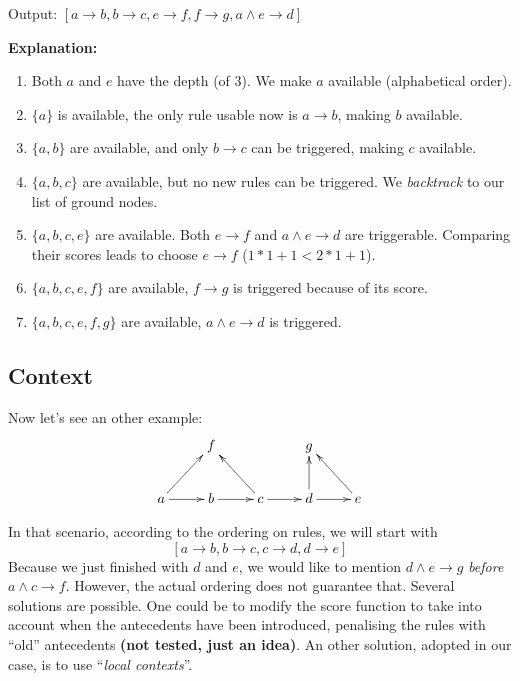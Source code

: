 \documentclass[a4paper]{article}
\newcommand*{\say}[1]{``{#1}''}
\newcommand*{\rar}{\rightarrow}                         %
\newcommand*{\conj}{\wedge}                             %
\begin{document}
\begin{center}
  \begin{minipage}{0.74\textwidth}
    Output: $ [a\rar b, b\rar c, e\rar f, f\rar g, a\conj e\rar d] $
  \end{minipage}
\end{center}

\textbf{Explanation:}
\begin{enumerate}
  \item Both $a$ and $e$ have the depth (of 3). We make $a$ available (alphabetical order).
  \item $\{a\}$ is available, the only rule usable now is $a \rar b$, making $b$ available.
  \item $\{a, b\}$ are available, and only $b\rar c$ can be triggered, making $c$ available.
  \item $\{a, b, c\}$ are available, but no new rules can be triggered. We \emph{backtrack} to our list of ground nodes.
  \item $\{a, b, c, e\}$ are available. Both $e \rar f$ and $a \conj e\rar d$ are triggerable.
        Comparing their scores leads to choose $e\rar f$ ($1*1+1 < 2*1+1$).
  \item $\{a, b, c, e, f\}$ are available, $f \rar g$ is triggered because of its score.
  \item $\{a, b, c, e, f, g\}$ are available, $a \conj e\rar d$ is triggered.
\end{enumerate}



\subsection{Context}\label{sec:ctx}

Now let's see an other example:
\[
  \xymatrix{%
                    & f       &                 & g             &           \\
    a\ar[r]\ar[ur]  & b\ar[r] & c\ar[r]\ar[ul]  & d\ar[r]\ar[u] & e\ar[ul]
  }
\]

In that scenario, according to the ordering on rules, we will start with
\[ [ a\rar b, b \rar c, c \rar d, d \rar e ] \]
Because we just finished with $d$ and $e$,
we would like to mention $d \conj e \rar g$ \emph{before} $a \conj c \rar f$.
However, the actual ordering does not guarantee that.
Several solutions are possible.
One could be to modify the score function to take into account when the antecedents have been introduced,
penalising the rules with \say{old} antecedents \textbf{(not tested, just an idea)}.
An other solution, adopted in our case, is to use \say{\emph{local contexts}}.
\end{document}
